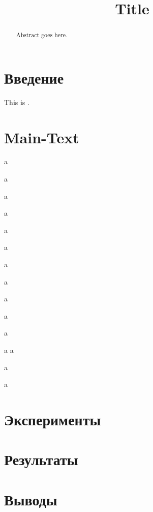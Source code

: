 \documentclass[
	11pt
] {article}
\author[1, 2]{\authFamilyFirst{} \authNameFirst{}}
\author[1]{\authFamilySecond{} \authNameSecond{}}
\author[1]{\authFamilyThird{} \authNameThird{}}
\affil[1]{Московский физико-технический институт, Долгопрудный, 141701}
\affil[2]{kafiulshabbir@phystech.edu}
\title{Title}
\begin{document}

\maketitle


\begin{abstract}
	Abstract goes here.
\end{abstract}


\section{Введение} \label{sec:intro}
	This is \cite{ramstad2019pore}.

\section{Main-Text}

a

a


a

a

a

a

a

a

a

a

a

a
a

a

a

\section{Эксперименты}


\section{Результаты}


\section{Выводы}




\end{document}
